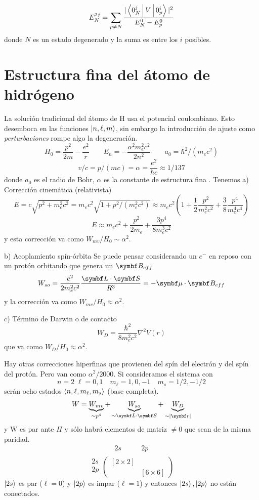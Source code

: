 \documentclass[10pt,oneside]{CBFT_book}
\begin{document}
\[
	E_N^{2j} = \sum_{p\neq N} \frac{|\Braket{0_N^j|V|0_p^i}|^2}{E_N^0 - E_p^0}
\]
donde $N$ es un estado degenerado y la suma es entre los $i$ posibles.

\section{Estructura fina del átomo de hidrógeno}

La solución tradicional del átomo de H usa el potencial coulombiano. Esto desemboca en las funciones 
$\Ket{n,\ell,m}$, sin embargo la introducción de ajuste como {\it perturbaciones} rompe algo la degeneración.
\[
	H_0=\frac{p^2}{2m} - \frac{e^2}{r} \qquad E_n = -\frac{\alpha^2m_e^2c^2}{2n^2} \qquad 
	a_0 = \hbar^2/(m_ec^2)
\]
\[
	v/c = p/(mc) = \alpha = \frac{e^2}{\hbar c} \approx 1/137
\]
donde $a_0$ es el radio de Bohr, $\alpha$ es la constante de estructura fina .
Tenemos 
a) Corrección cinemática (relativista)
\[	
	E = c \sqrt{p^2 + m_e^2c^2} = m_ec^2\sqrt{1 + p^2/(m_e^2c^2)} \approx 
	m_ec^2 \left( 1 + \frac{1}{2}\frac{p^2}{m_e^2c^2} + \frac{3}{8}\frac{p^4}{m_e^4c^4} \right)
\]
\[
	E \approx m_ec^2 + \frac{p^2}{2m_e} + \frac{3p^4}{8m_e^3c^2}
\]
y esta corrección va como $W_{mv}/H_0 \sim \alpha^2$.

b) Acoplamiento spín-órbita
Se puede pensar considerando un $e^-$ en reposo con un protón orbitando que genera un $\vb{B}_{eff}$
\[
	W_{so} = \frac{e^2}{2m_e^2c^2} \frac{\vb{L}\cdot\vb{S}}{R^3} = -\vb{\mu}\cdot\vb{B}_{eff}
\]
y la corrección va como $W_{mv}/H_0 \approx \alpha^2$.

c) Término de Darwin o de contacto
\[
	W_D = \frac{\hbar^2}{8m_e^2c^2} \nabla^2 V(r)
\]
que va como  $W_{D}/H_0 \approx \alpha^2$.

Hay otras correcciones hiperfinas que provienen del spín del electrón y del spín del protón. Pero van como 
$\alpha^2/2000$.
Si consideramos el sistema con 
\[
	n=2 \; \ell=0,1 \quad m_\ell = 1,0,-1 \quad m_s=1/2,-1/2
\]
serán ocho estados $\Braket{n,\ell,m_\ell,m_s}$ (base completa).
\[
	W = \underbrace{W_{mv}}_{\sim p^4} + \underbrace{W_{so}}_{\sim \vb{L}\cdot\vb{S}} + 
	\underbrace{W_D}_{\sim |\vb{r}|}
\]
y W es par ante $\Pi$ y sólo habrá elementos de matriz $\neq 0$ que sean de la misma paridad.
\[
	\begin{matrix}
	2s & \qquad 2p \\	 
	\end{matrix}
\]
\[
\begin{matrix}
 2s\\
 2p\\
\end{matrix}
	\begin{pmatrix}
	[2\times 2] & \\
	& [ 6\times 6 ] 
	\end{pmatrix}
\]
$\Ket{2s}$ es par ($\ell=0$) y $\Ket{2p}$ es impar ($\ell=1$) y entonces $\Ket{2s}, \Ket{2p}$
no están conectados.
\end{document}
